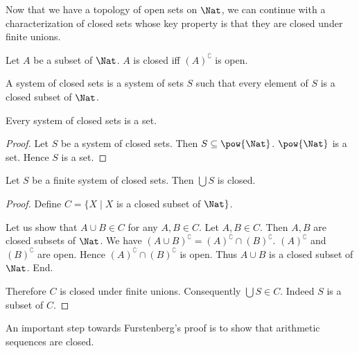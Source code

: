 \documentclass{stex}
\let\oldcomplement\complement
\renewcommand{\complement}[1]{\left(#1\right)^{\oldcomplement}}
\begin{document}
  Now that we have a topology of open sets on $\Nat$, we can continue
  with a characterization of closed sets whose key property is that they are
  closed under finite unions.

  \begin{forthel}
    \begin{definition}
      Let $A$ be a subset of $\Nat$.
      $A$ is closed iff $\complement{A}$ is open.
    \end{definition}

    \begin{definition}
      A system of closed sets is a system of sets $S$ such that every element of
      $S$ is a closed subset of $\Nat$.
    \end{definition}

    \begin{lemma}
      Every system of closed sets is a set.
    \end{lemma}
    \begin{proof}
      Let $S$ be a system of closed sets.
      Then $S \subseteq \pow{\Nat}$.
      $\pow{\Nat}$ is a set.
      Hence $S$ is a set.
    \end{proof}

    \begin{lemma}
      Let $S$ be a finite system of closed sets.
      Then $\bigcup S$ is closed.
    \end{lemma}
    \begin{proof}
      Define $C = \{ X \mid X$ is a closed subset of $\Nat \}$.

      Let us show that $A \cup B \in C$ for any $A, B \in C$.
        Let $A, B \in C$.
        Then $A, B$ are closed subsets of $\Nat$.
        We have $\complement{A \cup B} = \complement{A} \cap \complement{B}$.
        $\complement{A}$ and $\complement{B}$ are open.
        Hence $\complement{A} \cap \complement{B}$ is open.
        Thus $A \cup B$ is a closed subset of $\Nat$.
      End.

      Therefore $C$ is closed under finite unions.
      Consequently $\bigcup S \in C$.
      Indeed $S$ is a subset of $C$.
    \end{proof}
  \end{forthel}

  An important step towards Furstenberg's proof is to show that arithmetic
  sequences are closed.
\end{document}
